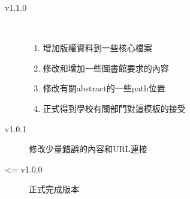 \begin{description}
\begin{description}
      \item[v1.1.0] \hfill \\
        \begin{enumerate}
          \item 增加版權資料到一些核心檔案
          \item 修改和增加一些圖書館要求的內容
          \item 修改有關abstract的一些path位置
          \item 正式得到學校有關部門對這模板的接受
        \end{enumerate}

      \item[v1.0.1] 修改少量錯誤的內容和URL連接

      \item[<= v1.0.0] 正式完成版本
    \end{description}
\end{description}

\EndChapter
